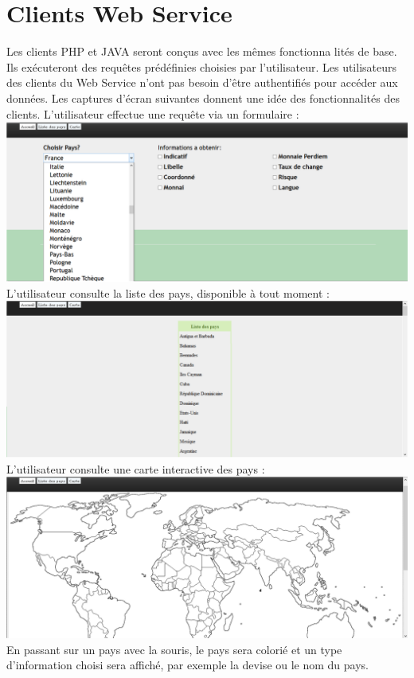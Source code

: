 \documentclass[12pt,a4paper,article]{memoir} %
\begin{document}
\section{Clients Web Service}
Les clients PHP et JAVA seront conçus avec les mêmes fonctionna lités de base.
Ils exécuteront des requêtes prédéfinies choisies par l’utilisateur.
Les utilisateurs des clients du Web Service n’ont pas besoin d’être authentifiés pour accéder
aux données.
Les captures d’écran suivantes donnent une idée des fonctionnalités des clients.
L’utilisateur effectue une requête via un formulaire :
\includegraphics[scale = 0.4]{images/Image2}
L’utilisateur consulte la liste des pays, disponible à tout moment :
\includegraphics[scale = 0.4]{images/Image3}
L’utilisateur consulte une carte interactive des pays :
\break
\includegraphics[scale = 0.4]{images/Image4}
En passant sur un pays avec la souris, le pays sera colorié et un type d’information choisi sera
affiché, par exemple la devise ou le nom du pays.
\end{document}
